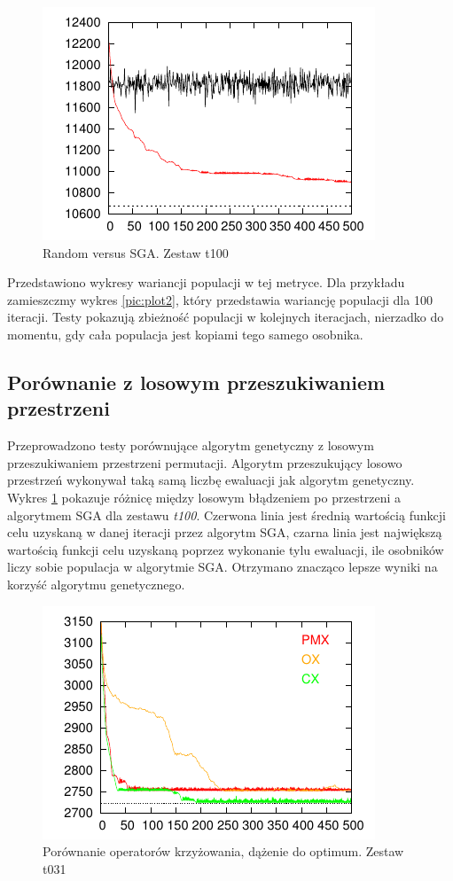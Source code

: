\documentclass[12pt]{article}
\begin{document}
\begin{figure}[h!]
  \centering
  \includegraphics[scale=1.5]{plots/plot3.pdf}
  \caption{Random versus SGA. Zestaw t100}
  \label{pic:plot3}
\end{figure}

Przedstawiono wykresy wariancji populacji w tej metryce. 
Dla przykładu zamieszczmy wykres \ref{pic:plot2}, który 
przedstawia wariancję populacji dla 100 iteracji. Testy
pokazują zbieżność populacji w kolejnych iteracjach, nierzadko do
momentu, gdy cała populacja jest kopiami tego samego osobnika.

\subsection{Porównanie z losowym przeszukiwaniem przestrzeni}

Przeprowadzono testy porównujące algorytm genetyczny z losowym
przeszukiwaniem przestrzeni permutacji. Algorytm przeszukujący losowo
przestrzeń wykonywał taką samą liczbę ewaluacji jak algorytm
genetyczny. Wykres \ref{pic:plot3} pokazuje różnicę między losowym błądzeniem po przestrzeni
a algorytmem SGA dla zestawu {\em t100}. Czerwona linia jest średnią wartością funkcji celu uzyskaną
w danej iteracji przez algorytm SGA, czarna linia jest największą wartością funkcji celu uzyskaną
poprzez wykonanie tylu ewaluacji, ile osobników liczy sobie populacja w algorytmie SGA.
Otrzymano znacząco lepsze wyniki na korzyść algorytmu genetycznego.

\begin{figure}[t]
  \centering
  \includegraphics[scale=1.1]{plots/plot4.pdf}
  \caption{Porównanie operatorów krzyżowania, dążenie do optimum. Zestaw t031}
  \label{pic:plot4}
\end{figure}
\end{document}
